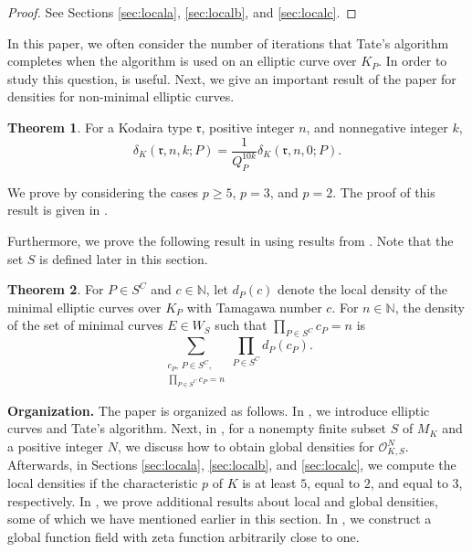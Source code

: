\documentclass[12pt,letterpaper]{amsart}
\theoremstyle{definition}
\newtheorem{theorem}{Theorem}[section]
\begin{document}
\begin{proof}
See Sections \ref{sec:locala}, \ref{sec:localb}, and \ref{sec:localc}.
\end{proof}

In this paper, we often consider the number of iterations that Tate's algorithm completes when the algorithm is used on an elliptic curve over $K_P$. In order to study this question,  is useful. Next, we give an important result of the paper for densities for non-minimal elliptic curves.

\begin{theorem}
\label{thm:multiterdensity}
For a Kodaira type $\mathfrak{r}$, positive integer $n$, and nonnegative integer $k$,
\[
\delta_K(\mathfrak{r},n,k;P)=\frac{1}{Q_P^{10k}}\delta_K(\mathfrak{r}, n, 0; P).
\]
\end{theorem}

We prove  by considering the cases $p\geq 5$, $p=3$, and $p=2$. The proof of this result is given in .

Furthermore, we prove the following result in  using results from . Note that the set $S$ is defined later in this section.

\begin{theorem}
\label{thm:densitytamn}
For $P\in S^C$ and $c\in\mathbb{N}$, let $d_P(c)$ denote the local density of the minimal elliptic curves over $K_P$ with Tamagawa number $c$. For $n\in\mathbb{N}$, the density of the set of minimal curves $E\in W_S$ such that $\prod_{P\in S^C} c_P = n$ is
\[
\sum_{\substack{c_P,\, P \in S^C, \\ \prod_{P\in S^C} c_P = n}} \prod_{P\in S^C} d_P(c_P).
\]
\end{theorem}

\textbf{Organization.} The paper is organized as follows. In , we introduce elliptic curves and Tate's algorithm. Next, in , for a nonempty finite subset $S$ of $M_K$ and a positive integer $N$, we discuss how to obtain global densities for $\mathcal{O}_{K,S}^N$. Afterwards, in Sections \ref{sec:locala}, \ref{sec:localb}, and \ref{sec:localc}, we compute the local densities if the characteristic $p$ of $K$ is at least $5$, equal to $2$, and equal to $3$, respectively. In , we prove additional results about local and global densities, some of which we have mentioned earlier in this section. In , we construct a global function field with zeta function arbitrarily close to one.
\end{document}
